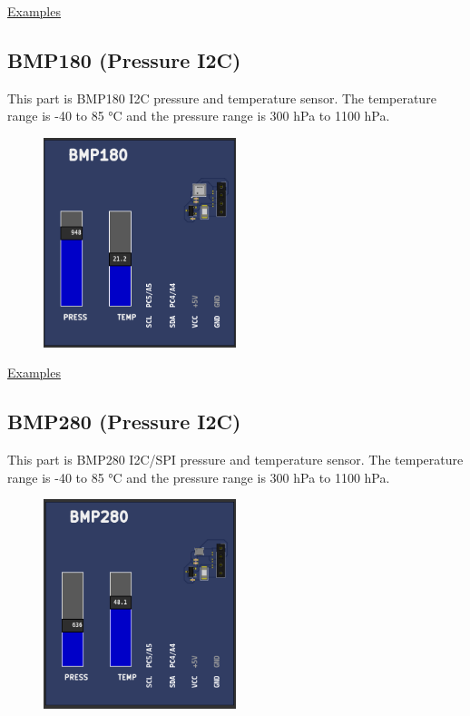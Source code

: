 \href{https://lcgamboa.github.io/picsimlab_examples/parts_ADXL345_(Accel).html}{Examples}

\vspace{0.5cm}

\subsection{BMP180 (Pressure I2C)} 

This part is BMP180 I2C pressure and temperature sensor. 
The temperature  range is -40 to 85 °C  
and the pressure range is 300 hPa to 1100 hPa.

\begin{figure}[H]
\center
\includegraphics[width=0.5\textwidth]{img/part_bmp180.png} 
\end{figure} 


\href{https://lcgamboa.github.io/picsimlab_examples/parts_BMP180_(Pressure_I2C).html}{Examples}

\vspace{0.5cm}

\subsection{BMP280 (Pressure I2C)} 

This part is BMP280 I2C/SPI pressure and temperature sensor. 
The temperature  range is -40 to 85 °C  
and the pressure range is 300 hPa to 1100 hPa.

\begin{figure}[H]
\center
\includegraphics[width=0.5\textwidth]{img/part_bmp280.png} 
\end{figure} 


